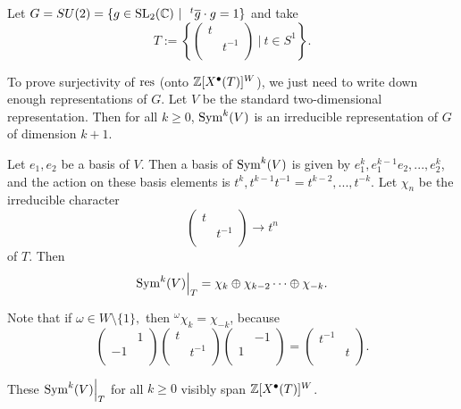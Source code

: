 \begin{exmpl}
Let $G = SU(2) = \{g \in \sl 2 \cmplx \ | \ \ ^t \conj{g} \cdot g = 1 \}$ and
take \[ T := \left\{ \left(\begin{matrix}
t & \\
  & t^{-1} \\
\end{matrix}\right) \ | \ t \in S^1 \right\}. \]

To prove surjectivity of $\operatorname{res}$ (onto $\mathbb{Z}[X^\bullet(T)]^W$), we just need to
write down enough representations of $G$. Let $V$ be the standard 
two-dimensional representation. Then for all $k \ge 0$, $\operatorname{Sym}^k(V)$ is an
irreducible representation of $G$ of dimension $k + 1$.

Let $e_1, e_2$ be a basis of $V$. Then a basis of $\operatorname{Sym}^k(V)$ is given by
$e_1^k, e_1^{k - 1} e_2, ..., e_2^k$, and the action on these basis elements
is $t^k, t^{k - 1}t^{-1} = t^{k - 2}, ..., t^{-k}$. Let $\chi_n$ be the
irreducible character
\[ \left(\begin{matrix}
t & \\
  & t^{-1} \\
\end{matrix}\right) \rightarrow t^n \]
of $T$. Then 
\[ \restr{\op{Sym}^k(V)}{T}
    = \chi_k \oplus \chi_{k - 2} \cdots \oplus \chi_{-k}.\]

Note that if $\omega \in W \setminus \{ 1 \},$ then
$^\omega \chi_k = \chi_{-k}$, because
\[ \left(\begin{matrix}
& 1 \\
-1 & \\
\end{matrix}\right) \left(\begin{matrix}
t & \\
& t^{-1} \\
\end{matrix}\right) \left(\begin{matrix}
& -1 \\
1 & \\
\end{matrix}\right) = \left(\begin{matrix}
t^{-1} & \\
& t \\
\end{matrix}\right). \]

These $\restr{\op{Sym}^k(V)}{T}$ for all $k \ge 0$ visibly span
$\mathbb{Z}[X^\bullet(T)]^W$.
\end{exmpl}
